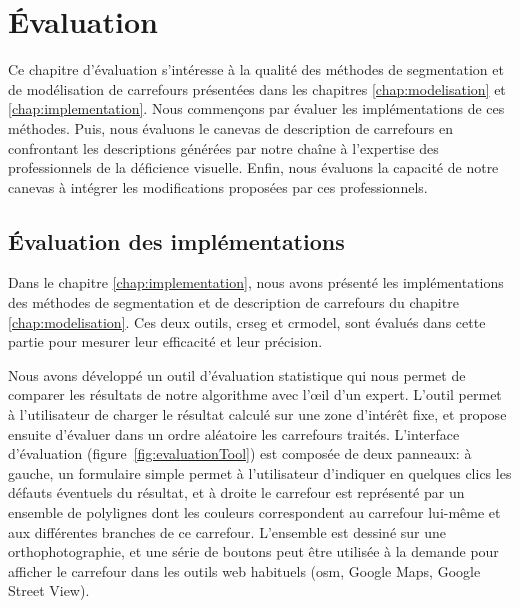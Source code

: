\chapter{Évaluation}
\label{chap:evaluation}

Ce chapitre d'évaluation s'intéresse à la qualité des méthodes de segmentation et de modélisation de carrefours présentées dans les chapitres \ref{chap:modelisation} et \ref{chap:implementation}. Nous commençons par évaluer les implémentations de ces méthodes. Puis, nous évaluons le canevas de description de carrefours en confrontant les descriptions générées par notre chaîne à l'expertise des professionnels de la déficience visuelle. Enfin, nous évaluons la capacité de notre canevas à intégrer les modifications proposées par ces professionnels.

\section{Évaluation des implémentations}

\label{sec:evaluation_implementation}

Dans le chapitre \ref{chap:implementation}, nous avons présenté les implémentations des méthodes de segmentation et de description de carrefours du chapitre \ref{chap:modelisation}. Ces deux outils, crseg et crmodel, sont évalués dans cette partie pour mesurer leur efficacité et leur précision.

\newpar{}

Nous avons développé un outil d'évaluation statistique qui nous permet de comparer les résultats de notre algorithme avec l'œil d'un expert. L'outil permet à l'utilisateur de charger le résultat calculé sur une zone d'intérêt fixe, et propose ensuite d'évaluer dans un ordre aléatoire les carrefours traités. L'interface d'évaluation (figure~\ref{fig:evaluationTool}) est composée de deux panneaux: à gauche, un formulaire simple permet à l'utilisateur d'indiquer en quelques clics les défauts éventuels du résultat, et à droite le carrefour est représenté par un ensemble de polylignes dont les couleurs correspondent au carrefour lui-même et aux différentes branches de ce carrefour. L'ensemble est dessiné sur une orthophotographie, et une série de boutons peut être utilisée à la demande pour afficher le carrefour dans les outils web habituels (\gls{osm}, Google Maps, Google Street View).

